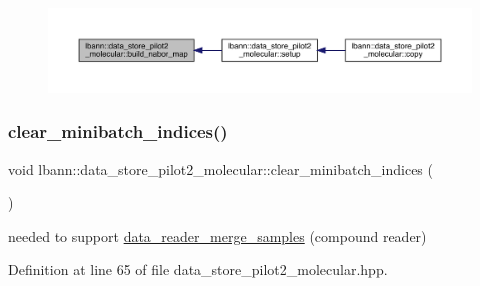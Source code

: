 \begin{figure}[H]
\begin{center}
\leavevmode
\includegraphics[width=350pt]{classlbann_1_1data__store__pilot2__molecular_af70726cfb8377832ce457d9b874bf34e_icgraph}
\end{center}
\end{figure}
\mbox{\label{classlbann_1_1data__store__pilot2__molecular_a246274b369ed60bf214cf503019ab2ca}} 
\subsubsection{\texorpdfstring{clear\+\_\+minibatch\+\_\+indices()}{clear\_minibatch\_indices()}}
{\footnotesize\ttfamily void lbann\+::data\+\_\+store\+\_\+pilot2\+\_\+molecular\+::clear\+\_\+minibatch\+\_\+indices (\begin{DoxyParamCaption}{ }\end{DoxyParamCaption})\hspace{0.3cm}{\ttfamily [inline]}}



needed to support \hyperlink{classlbann_1_1data__reader__merge__samples}{data\+\_\+reader\+\_\+merge\+\_\+samples} (compound reader) 



Definition at line 65 of file data\+\_\+store\+\_\+pilot2\+\_\+molecular.\+hpp.


